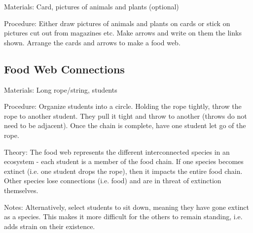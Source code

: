 \begin{multicols}{2}
\begin{description*}
\item[Materials:]{Card, pictures of animals and plants (optional)}
\item[Procedure:]{Either draw pictures of animals
and plants on cards or stick on
pictures cut out from magazines
etc. Make arrows and write on
them the links shown. Arrange
the cards and arrows to make a
food web.}
\end{description*}

\subsection{Food Web Connections} %


\begin{description*}
\item[Materials:]{Long rope/string, students}
\item[Procedure:]{Organize students into a circle. Holding the rope tightly, throw the rope to another student. They pull it tight and throw to another (throws do not need to be adjacent). Once the chain is complete, have one student let go of the rope.}
\item[Theory:]{The food web represents the different interconnected species in an ecosystem - each student is a member of the food chain. If one species becomes extinct (i.e. one student drops the rope), then it impacts the entire food chain. Other species lose connections (i.e. food) and are in threat of extinction themselves.}
\item[Notes:]{Alternatively, select students to sit down, meaning they have gone extinct as a species. This makes it more difficult for the others to remain standing, i.e. adds strain on their existence.}
\end{description*}



\end{multicols}

\pagebreak